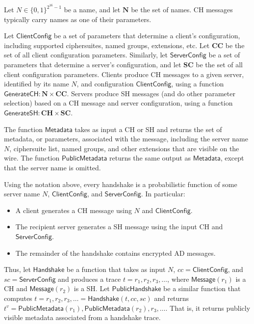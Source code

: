 \documentclass{article}
\theoremstyle{definition}
\begin{document}
Let $N \in \{0,1\}^{2^{16} - 1}$ be a name, and let $\mathbf{N}$ be the set of names. 
CH messages typically carry names as one of their parameters.

Let $\mathsf{ClientConfig}$ be a set of parameters that determine a client's configuration,
including supported ciphersuites, named groups, extensions, etc. 
Let $\mathbf{CC}$ be the set of all client configuration parameters.
Similarly, let $\mathsf{ServerConfig}$ be a set of parameters that determine a server's configuration,
and let $\mathbf{SC}$ be the set of all client configuration parameters.
Clients produce CH messages to a given server, identified by its name $N$, and configuration
$\mathsf{ClientConfig}$, using a function $\mathsf{GenerateCH}: \mathbf{N} \times \mathbf{CC}$.
Servers produce SH messages (and do other parameter selection) based on a CH message and 
server configuration, using a function $\mathsf{GenerateSH}: \mathbf{CH} \times \mathbf{SC}$.

The function $\mathsf{Metadata}$ takes as input a CH or SH and returns the set of metadata,
or parameters, associated with the message, including the server name $N$, ciphersuite list,
named groups, and other extensions that are visible on the wire. The function
$\mathsf{PublicMetadata}$ returns the same output as $\mathsf{Metadata}$, except that
the server name is omitted. 

Using the notation above, every handshake is a probabilistic function of some server name $N$,
$\mathsf{ClientConfig}$, and $\mathsf{ServerConfig}$. In particular:
%
\begin{itemize}
    \item A client generates a CH message using $N$ and $\mathsf{ClientConfig}$.
    \item The recipient server generates a SH message using the input CH and $\mathsf{ServerConfig}$.
    \item The remainder of the handshake contains encrypted AD messages.
\end{itemize}
%
Thus, let $\mathsf{Handshake}$ be a function that takes as input $N$,
$cc = \mathsf{ClientConfig}$, and $sc = \mathsf{ServerConfig}$ and produces a trace 
$t = r_1, r_2, r_3, \dots$, where $\mathsf{Message}(r_1)$ is a CH and 
$\mathsf{Message}(r_2)$ is a SH. Let $\mathsf{PublicHandshake}$ be a similar
function that computes $t = r_1, r_2, r_3, \dots = \mathsf{Handshake}(t, cc, sc)$ and returns 
$t^v = \mathsf{PublicMetadata}(r_1), \mathsf{PublicMetadata}(r_2), r_3, \dots$. That is,
it returns publicly visible metadata associated from a handshake trace. 
\end{document}
